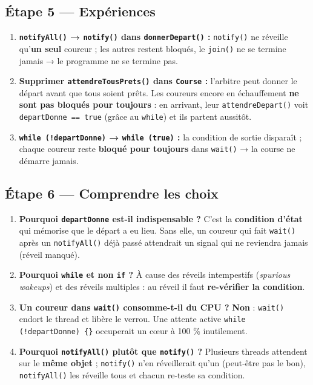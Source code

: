 \documentclass[11pt,a4paper]{article}
\begin{document}
\subsection{Étape 5 — Expériences}
\begin{enumerate}[nosep]
  \item \textbf{\texttt{notifyAll()} → \texttt{notify()} dans \texttt{donnerDepart()} :}
  \texttt{notify()} ne réveille qu'\textbf{un seul} coureur ; les autres restent
  bloqués, le \texttt{join()} ne se termine jamais → le programme ne se termine pas.
  \item \textbf{Supprimer \texttt{attendreTousPrets()} dans \texttt{Course} :}
  l'arbitre peut donner le départ avant que tous soient prêts. Les coureurs encore en
  échauffement \textbf{ne sont pas bloqués pour toujours} : en arrivant, leur
  \texttt{attendreDepart()} voit \texttt{departDonne == true} (grâce au \texttt{while})
  et ils partent aussitôt.
  \item \textbf{\texttt{while (!departDonne)} → \texttt{while (true)} :} la condition de
  sortie disparaît ; chaque coureur reste \textbf{bloqué pour toujours} dans
  \texttt{wait()} → la course ne démarre jamais.
\end{enumerate}

\subsection{Étape 6 — Comprendre les choix}
\begin{enumerate}[nosep]
  \item \textbf{Pourquoi \texttt{departDonne} est-il indispensable ?} C'est la
  \textbf{condition d'état} qui mémorise que le départ a eu lieu. Sans elle, un coureur
  qui fait \texttt{wait()} après un \texttt{notifyAll()} déjà passé attendrait un signal
  qui ne reviendra jamais (réveil manqué).
  \item \textbf{Pourquoi \texttt{while} et non \texttt{if} ?} À cause des réveils
  intempestifs (\emph{spurious wakeups}) et des réveils multiples : au réveil il faut
  \textbf{re-vérifier la condition}.
  \item \textbf{Un coureur dans \texttt{wait()} consomme-t-il du CPU ?} \textbf{Non} :
  \texttt{wait()} endort le thread et libère le verrou. Une attente active
  \texttt{while (!departDonne) \{\}} occuperait un cœur à 100 \% inutilement.
  \item \textbf{Pourquoi \texttt{notifyAll()} plutôt que \texttt{notify()} ?} Plusieurs
  threads attendent sur le \textbf{même objet} ; \texttt{notify()} n'en réveillerait
  qu'un (peut-être pas le bon), \texttt{notifyAll()} les réveille tous et chacun
  re-teste sa condition.
\end{enumerate}
\end{document}

